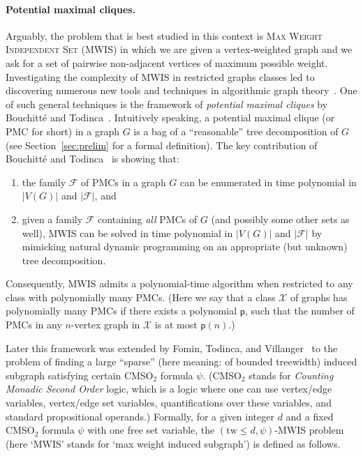 \documentclass[11pt,a4paper]{article}
\theoremstyle{definition}
\newcommand{\CMSO}{\textsf{CMSO}$_2$\xspace}
\begin{document}
\paragraph{Potential maximal cliques.}
Arguably, the problem that is best studied in this context is \textsc{Max Weight Independent Set} (MWIS) in which we are given a vertex-weighted graph and we ask for a set of pairwise non-adjacent vertices of maximum possible weight.
Investigating the complexity of MWIS in restricted graphs classes led to discovering numerous new tools and techniques in algorithmic graph theory~\cite{GROTSCHEL1984325,DBLP:conf/stoc/GartlandLMPPR24,Edmonds_1965,DBLP:journals/jctb/DallardMS24}.
One of such general techniques is the framework of \emph{potential maximal cliques} by Bouchitt\'e and Todinca~\cite{BouchitteT02,Todinca}.
Intuitively speaking, a potential maximal clique (or PMC for short) in a graph $G$ is a bag of a ``reasonable'' tree decomposition of $G$ (see Section~\ref{sec:prelim} for a formal definition). The key contribution of Bouchitt\'e and Todinca~\cite{BouchitteT02,Todinca} is showing that:
\begin{enumerate}
    \item the family $\mathcal{F}$ of PMCs in a graph $G$ can be enumerated in time polynomial in $|V(G)|$ and $|\mathcal{F}|$, and
    \item given a family $\mathcal{F}$ containing \emph{all} PMCs of $G$ (and possibly some other sets as well), MWIS can be solved in time polynomial in $|V(G)|$ and $|\mathcal{F}|$ by mimicking natural dynamic programming on an appropriate (but unknown) tree decomposition.
\end{enumerate}

Consequently, MWIS admits a polynomial-time algorithm when restricted to any class  with polynomially many PMCs. (Here we say that a class $\mathcal{X}$ of graphs has polynomially many PMCs if there exists a polynomial $\mathsf{p}$,  such that the number of PMCs in any $n$-vertex graph in $\mathcal{X}$ is at most $\mathsf{p}(n)$.)

Later this framework was extended by Fomin, Todinca, and Villanger~\cite{FominTV15} to the problem of finding a large ``sparse'' (here meaning: of bounded treewidth) induced subgraph satisfying certain \CMSO formula $\psi$. (\CMSO stands for \emph{Counting Monadic Second Order} logic, which is a logic where one can use vertex/edge variables, vertex/edge set variables, quantifications over these variables, and standard propositional operands.) Formally, for a given integer $d$ and a fixed \CMSO formula $\psi$ with one free set variable, the 
$(\mathrm{tw} \leq d,\psi)$-MWIS problem (here `MWIS' stands for `max weight induced subgraph') is defined as follows.
\end{document}
